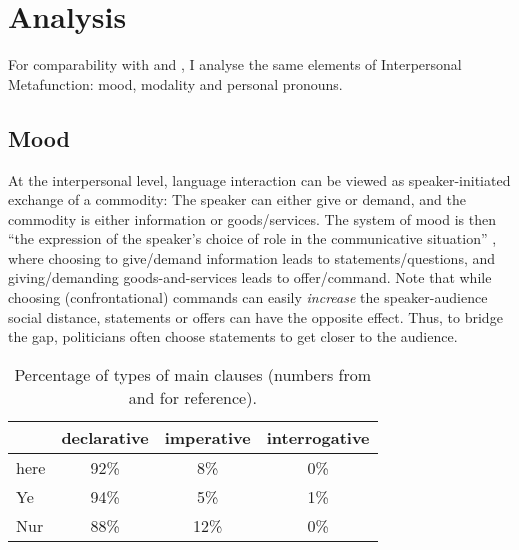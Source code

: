 \documentclass[11pt]{article}
\begin{document}
\section{Analysis}{
	For comparability with \citeauthor{Nur} and \citeauthor{Ye}, I analyse the same elements of Interpersonal Metafunction: mood, modality and personal pronouns.
 	
 	\subsection{Mood}{
 		At the interpersonal level, language interaction can be viewed as speaker-initiated exchange of a commodity: The speaker can either give or demand, and the commodity is either information or goods/services. 
 		The system of mood is then ``the expression of the speaker's choice of role in the communicative situation'' \citep{Halliday1970ModalityMood}, where choosing to give/demand information leads to statements/questions, and giving/demanding goods-and-services leads to offer/command. Note that while choosing (confrontational) commands can easily \textit{increase} the speaker-audience social distance, statements or offers can have the opposite effect. Thus, to bridge the gap, politicians often choose statements to get closer to the audience.

		\begin{table}[h!tb]
	      \centering
			\begin{tabular}{l|ccc}
			         & declarative & imperative & interrogative \\
			  \hline
			  \hline
			  here   & 92\%        & 8\%        & 0\% \\
			  \hline
			  Ye     & 94\%        & 5\%        & 1\% \\
			  Nur    & 88\%        & 12\%       & 0\% \\
			\end{tabular}
	      \caption{Percentage of types of main clauses (numbers from \citeauthor{Ye} and \citeauthor{Nur} for reference).}
	      \label{tab:mood}
	    \end{table}

}}
\end{document}
